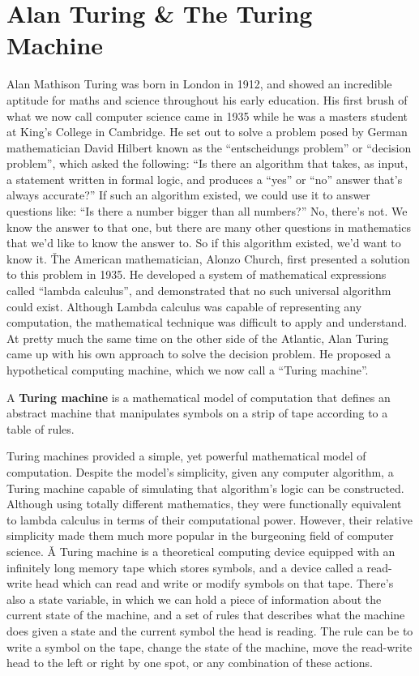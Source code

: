 \section{Alan Turing \& The Turing Machine}

Alan Mathison Turing was born in London in 1912, and showed an incredible aptitude for maths and science throughout
his early education. His first brush of what we now call computer science came in 1935 while he was a masters student
at King's College in Cambridge. He set out to solve a problem posed by German mathematician David Hilbert known as
the ``entscheidungs problem'' or ``decision problem'', which asked the following: ``Is there an algorithm that takes, as
input, a statement written in formal logic, and produces a ``yes'' or ``no'' answer that's always accurate?'' If such
an algorithm existed, we could use it to answer questions like: ``Is there a number bigger than all numbers?'' No,
there's not. We know the answer to that one, but there are many other questions in mathematics that we'd like to know
the answer to. So if this algorithm existed, we'd want to know it. \v

The American mathematician, Alonzo Church, first presented a solution to this problem in 1935. He developed a system
of mathematical expressions called ``lambda calculus'', and demonstrated that no such universal algorithm could exist.
Although Lambda calculus was capable of representing any computation, the mathematical technique was difficult to
apply and understand. At pretty much the same time on the other side of the Atlantic, Alan Turing came up with his
own approach to solve the decision problem. He proposed a hypothetical computing machine, which we now call a
``Turing machine''.

A \textbf{Turing machine} is a mathematical model of computation that defines an abstract machine that manipulates
symbols on a strip of tape according to a table of rules.
\ed

Turing machines provided a simple, yet powerful mathematical model of computation. Despite the model's simplicity,
given any computer algorithm, a Turing machine capable of simulating that algorithm's logic can be constructed.
Although using totally different mathematics, they were functionally equivalent to lambda calculus in terms of their
computational power. However, their relative simplicity made them much more popular in the burgeoning field of
computer science. \v

A Turing machine is a theoretical computing device equipped with an infinitely long memory tape which stores symbols,
and a device called a read-write head which can read and write or modify symbols on that tape. There's also a state
variable, in which we can hold a piece of information about the current state of the machine, and a set of rules that
describes what the machine does given a state and the current symbol the head is reading. The rule can be to write a
symbol on the tape, change the state of the machine, move the read-write head to the left or right by one spot, or
any combination of these actions.

